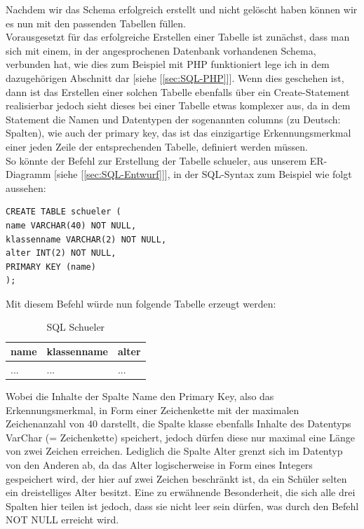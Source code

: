 \documentclass[12pt,a4paper,bibliography=totocnumbered,listof=totocnumbered]{scrartcl}
\begin{document}
\begin{minipage}{\linewidth}
Nachdem wir das Schema erfolgreich erstellt und nicht gelöscht haben können wir es nun mit den passenden Tabellen füllen.\\
Vorausgesetzt für das erfolgreiche Erstellen einer Tabelle ist zunächst, dass man sich mit einem, in der angesprochenen Datenbank vorhandenen Schema, verbunden hat, wie dies zum Beispiel mit PHP funktioniert lege ich in dem dazugehörigen Abschnitt dar [siehe [\ref{sec:SQL-PHP}]]. 
Wenn dies geschehen ist, dann ist das Erstellen einer solchen Tabelle ebenfalls über ein \glqq Create-Statement\grqq{} realisierbar jedoch sieht dieses bei einer Tabelle etwas komplexer aus, da in dem Statement die Namen und Datentypen der sogenannten \glqq columns\grqq{} (zu Deutsch: Spalten), wie auch der \glqq primary key\grqq{}, das ist das einzigartige Erkennungsmerkmal einer jeden Zeile der entsprechenden Tabelle, definiert werden müssen.\\
 

So könnte der Befehl zur Erstellung der Tabelle \glqq schueler\grqq{}, aus unserem ER-Diagramm [siehe [\ref{sec:SQL-Entwurf}]], in der SQL-Syntax zum Beispiel wie folgt aussehen:
\\
\vspace{1em}
\begin{lstlisting}[caption= SQL Create Table, label=lst:sql-create-table]
CREATE TABLE schueler (
name VARCHAR(40) NOT NULL, 
klassenname VARCHAR(2) NOT NULL, 
alter INT(2) NOT NULL,
PRIMARY KEY (name)
);
\end{lstlisting}

Mit diesem Befehl würde nun folgende Tabelle erzeugt werden:

\vspace{1em}
\begin{table}[!h]
	\centering
	\begin{tabular}{|l|l|l|}
		\hline
		\textbf{name} & \textbf{klassenname} & \textbf{alter}\\
		\hline
		... & ... & ...\\
		
	\end{tabular}
	\caption{SQL Schueler}
	\label{tab:sql-schueler}
\end{table}

Wobei die Inhalte der Spalte \glqq Name\grqq{} den Primary Key, also das Erkennungsmerkmal, in Form einer Zeichenkette mit der maximalen Zeichenanzahl von 40 darstellt, die Spalte \glqq klasse\grqq{} ebenfalls Inhalte des Datentyps VarChar (= Zeichenkette) speichert, jedoch dürfen diese nur maximal eine Länge von zwei Zeichen erreichen.
Lediglich die Spalte \glqq Alter\grqq{} grenzt sich im Datentyp von den Anderen ab, da das Alter logischerweise in Form eines Integers gespeichert wird, der hier auf zwei Zeichen beschränkt ist, da ein Schüler selten ein dreistelliges Alter besitzt. Eine zu erwähnende Besonderheit, die sich alle drei Spalten hier teilen ist jedoch, dass sie nicht leer sein dürfen, was durch den Befehl \glqq NOT NULL\grqq{} erreicht wird.


\end{minipage}
\end{document}
